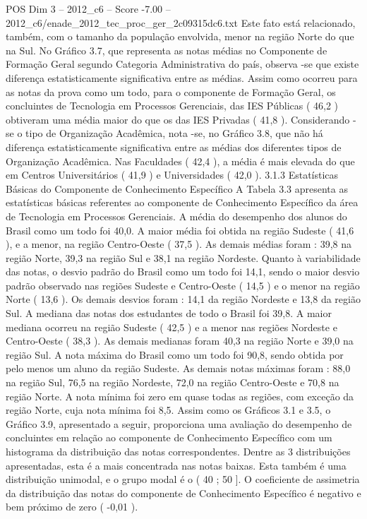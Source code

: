 \begin{textsample}{POS Dim 3 – 2012\_c6 – Score -7.00 – 2012\_c6/enade\_2012\_tec\_proc\_ger\_2c09315dc6.txt}
Este fato está relacionado, também, com o tamanho da população envolvida, menor na região Norte do que na Sul.
No Gráfico 3.7, que representa as notas médias no Componente de Formação Geral segundo Categoria Administrativa do país, observa -se que existe diferença estatisticamente significativa entre as médias.
Assim como ocorreu para as notas da prova como um todo, para o componente de Formação Geral, os concluintes de Tecnologia em Processos Gerenciais, das IES Públicas ( 46,2 ) obtiveram uma média maior do que os das IES Privadas ( 41,8 ).
Considerando -se o tipo de Organização Acadêmica, nota -se, no Gráfico 3.8, que não há diferença estatisticamente significativa entre as médias dos diferentes tipos de Organização Acadêmica.
Nas Faculdades ( 42,4 ), a média é mais elevada do que em Centros Universitários ( 41,9 ) e Universidades ( 42,0 ). 3.1.3 Estatísticas Básicas do Componente de Conhecimento Específico A Tabela 3.3 apresenta as estatísticas básicas referentes ao componente de Conhecimento Específico da área de Tecnologia em Processos Gerenciais.
A média do desempenho dos alunos do Brasil como um todo foi 40,0.
A maior média foi obtida na região Sudeste ( 41,6 ), e a menor, na região Centro-Oeste ( 37,5 ).
As demais médias foram : 39,8 na região Norte, 39,3 na região Sul e 38,1 na região Nordeste.
Quanto à variabilidade das notas, o desvio padrão do Brasil como um todo foi 14,1, sendo o maior desvio padrão observado nas regiões Sudeste e Centro-Oeste ( 14,5 ) e o menor na região Norte ( 13,6 ).
Os demais desvios foram : 14,1 da região Nordeste e 13,8 da região Sul.
A mediana das notas dos estudantes de todo o Brasil foi 39,8.
A maior mediana ocorreu na região Sudeste ( 42,5 ) e a menor nas regiões Nordeste e Centro-Oeste ( 38,3 ).
As demais medianas foram 40,3 na região Norte e 39,0 na região Sul.
A nota máxima do Brasil como um todo foi 90,8, sendo obtida por pelo menos um aluno da região Sudeste.
As demais notas máximas foram : 88,0 na região Sul, 76,5 na região Nordeste, 72,0 na região Centro-Oeste e 70,8 na região Norte.
A nota mínima foi zero em quase todas as regiões, com exceção da região Norte, cuja nota mínima foi 8,5.
Assim como os Gráficos 3.1 e 3.5, o Gráfico 3.9, apresentado a seguir, proporciona uma avaliação do desempenho de concluintes em relação ao componente de Conhecimento Específico com um histograma da distribuição das notas correspondentes.
Dentre as 3 distribuições apresentadas, esta é a mais concentrada nas notas baixas.
Esta também é uma distribuição unimodal, e o grupo modal é o ( 40 ; 50 ].
O coeficiente de assimetria da distribuição das notas do componente de Conhecimento Específico é negativo e bem próximo de zero ( -0,01 ).

\end{textsample}
